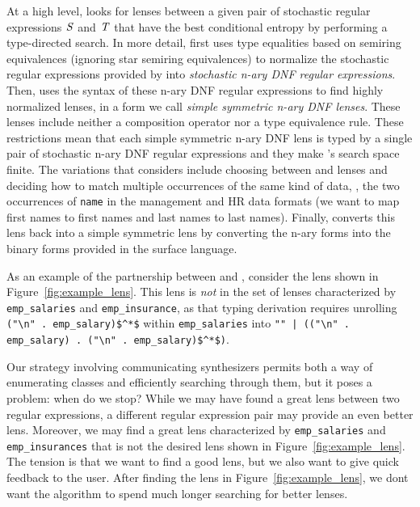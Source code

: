 \documentclass[acmsmall,screen,anonymous]{acmart}
\begin{document}
At a high level, \GreedySynth looks for lenses between a given pair of
stochastic regular expressions $\mathit{S}$ and $\mathit{T}$ that have the
best conditional entropy by performing a type-directed search. 
In more detail, \GreedySynth first uses type equalities based on semiring 
equivalences (ignoring star semiring equivalences) to normalize the
stochastic regular expressions provided by \RXSearch into 
\emph{stochastic n-ary DNF regular expressions}.  
Then, \GreedySynth uses the syntax of these n-ary DNF regular
expressions to find highly normalized lenses, in a
form we call \emph{simple symmetric n-ary DNF lenses}.  These lenses include
neither a composition operator nor a type equivalence rule.  These
restrictions mean that each simple symmetric n-ary DNF lens is typed
by a single pair of stochastic n-ary DNF regular expressions and they
make \GreedySynth's search space finite.  The variations that \GreedySynth
considers include choosing between \IdentityLens{} and  \Disconnect
lenses and deciding how to match multiple occurrences of the same kind
of data, \EG, the two occurrences of \lstinline{name} in the
management and HR data formats (we want to map first names to first
names and last names to last names). 
Finally, \GreedySynth converts this lens 
back into a simple symmetric lens by converting the n-ary forms into
the binary forms provided in the surface language.  



As an example of the partnership between \RXSearch and \GreedySynth,
consider the lens shown in Figure~\ref{fig:example_lens}. 
This lens is \emph{not} in the set of lenses 
characterized by \lstinline{emp_salaries} and \lstinline{emp_insurance}, as that
typing derivation requires unrolling \lstinline{("\n" . emp_salary)$^*$} within
\lstinline{emp_salaries} into \lstinline{"" | (("\n" . emp_salary) . ("\n" . emp_salary)$^*$)}.


Our strategy involving communicating synthesizers permits both a way of
enumerating classes and efficiently searching through them, but it poses a
problem: when do we stop? While we may have found a great lens between two regular
expressions, a different regular expression pair may provide an even better
lens. Moreover, we may find a great lens characterized by
\lstinline{emp_salaries} and \lstinline{emp_insurances} that is not the
desired lens shown in Figure~\ref{fig:example_lens}.  The
tension is that we want to find a good lens, but we also want to give quick feedback to
the user. After finding the lens in Figure~\ref{fig:example_lens}, we dont want
the algorithm to spend much longer searching for better lenses.
\end{document}
